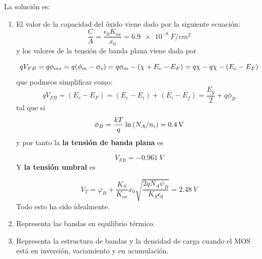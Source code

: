 \vspace*{1em}
La solución es:
\begin{enumerate}[label=\alph*)]
	\item El valor de la capacidad del óxido viene dado por la siguiente ecuación:
	      \begin{equation*}
		      \frac{C}{A} = \frac{\epsilon_0 K_{ox}}{x_0} = \SI{6.9e-8}{F/cm^{2}}
	      \end{equation*}
	      y los valores de la tensión de banda plana viene dada por

	      \begin{equation*}
		      qV_{FB} = q\phi_{ms} = q(\phi_m - \phi_s) = q\phi_m -  \left( \chi + E_c - E_F \right) = q \chi - q \chi -  \left( E_c  - E_F \right)
	      \end{equation*}
	      que podmeos simplificar como:
	      \begin{equation*}
		      qV_{FB} =  (E_c - E_F) = (E_c - E_i) + (E_i - E_f) = \frac{E_g}{2} + q\phi_B
	      \end{equation*}
	      tal que si
	      \begin{equation*}
		      \phi_B = \frac{kT}{q} \ln \left( N_A/n_i \right) = \SI{0.4}{V}
	      \end{equation*}
	      y por tanto la \textbf{la tensión de banda plana} es

	      \begin{equation*}
		      V_{FB} = -\SI{0.961}{V}
	      \end{equation*}
	      Y \textbf{la tensión umbral} es

	      \begin{equation*}
		      V_T = \varphi_B + \frac{K_S}{K_{ox}}  x_0 \sqrt{\frac{2q N_A \psi_B}{K_S \epsilon_0}}  = \SI{2.48}{V}
	      \end{equation*}
	      Todo esto ha sido idealmente.
	\item Representa las bandas en equilibrio térmico.
	\item Representa la estructura de bandas y la densidad de carga cuando el MOS está en inversión, vaciamiento y en acumulación.
\end{enumerate}


\vspace*{2em}

